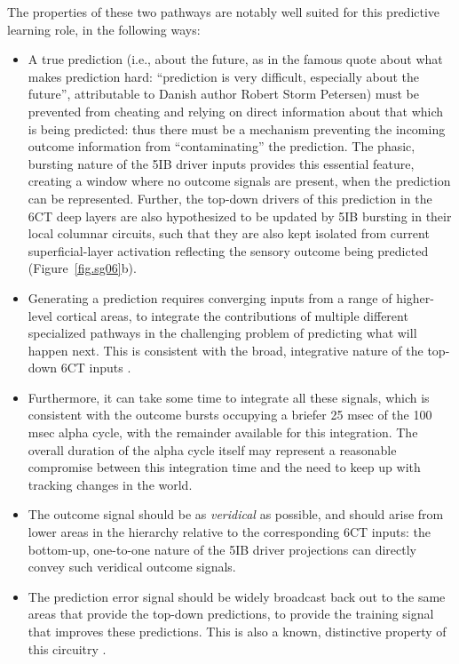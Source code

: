 \documentclass[11pt,twoside]{article}
\newif\myifpdf
\begin{document}
The properties of these two pathways are notably well suited for this predictive learning role, in the following ways:
\begin{itemize}
	\item A true prediction (i.e., about the future, as in the famous quote about what makes prediction hard: ``prediction is very difficult, especially about the future'', attributable to Danish author Robert Storm Petersen) must be prevented from cheating and relying on direct information about that which is being predicted: thus there must be a mechanism preventing the incoming outcome information from ``contaminating'' the prediction.  The phasic, bursting nature of the 5IB driver inputs provides this essential feature, creating a window where no outcome signals are present, when the prediction can be represented.  Further, the top-down drivers of this prediction in the 6CT deep layers are also hypothesized to be updated by 5IB bursting in their local columnar circuits, such that they are also kept isolated from current superficial-layer activation reflecting the sensory outcome being predicted (Figure~\ref{fig.sg06}b).
	\item Generating a prediction requires converging inputs from a range of higher-level cortical areas, to integrate the contributions of multiple different specialized pathways in the challenging problem of predicting what will happen next.  This is consistent with the broad, integrative nature of the top-down 6CT inputs \cite{Shipp03,Mumford91}.
	\item Furthermore, it can take some time to integrate all these signals, which is consistent with the outcome bursts occupying a briefer 25 msec of the 100 msec alpha cycle, with the remainder available for this integration.  The overall duration of the alpha cycle itself may represent a reasonable compromise between this integration time and the need to keep up with tracking changes in the world.
	\item The outcome signal should be as \emph{veridical} as possible, and should arise from lower areas in the hierarchy relative to the corresponding 6CT inputs: the bottom-up, one-to-one nature of the 5IB driver projections can directly convey such veridical outcome signals.
	\item The prediction error signal should be widely broadcast back out to the same areas that provide the top-down predictions, to provide the training signal that improves these predictions.  This is also a known, distinctive property of this circuitry \cite{Shipp03,Mumford91}.

\end{itemize}
\end{document}
